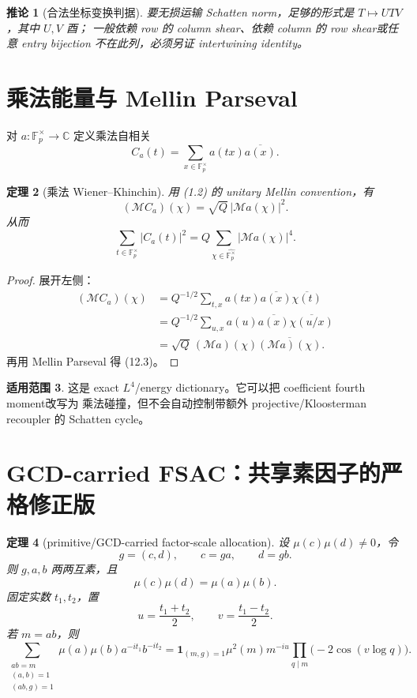 \documentclass[11pt,a4paper]{ctexart}
\newtheorem{theorem}{定理}[section]
\newtheorem{corollary}[theorem]{推论}
\theoremstyle{definition}
\newtheorem{remark}[theorem]{适用范围}
\newcommand{\F}{\mathbb F}
\newcommand{\C}{\mathbb C}
\newcommand{\G}{\F_p^\times}
\newcommand{\Gh}{\widehat{\G}}
\newcommand{\1}{\mathbf 1}
\begin{document}
\begin{corollary}[合法坐标变换判据]
要无损运输 Schatten norm，足够的形式是 $T\mapsto UTV$，其中 $U,V$ 酉；
一般依赖 row 的 column shear、依赖 column 的 row shear或任意 entry bijection
不在此列，必须另证 intertwining identity。
\end{corollary}

\section{乘法能量与 Mellin Parseval}

对 $a:\G\to\C$ 定义乘法自相关
\[
C_a(t)=\sum_{x\in\G}a(tx)\overline{a(x)}.
\tag{12.1}
\]

\begin{theorem}[乘法 Wiener--Khinchin]
用 (1.2) 的 unitary Mellin convention，有
\[
\boxed{
(\mathcal M C_a)(\chi)=\sqrt Q\,|\mathcal Ma(\chi)|^2.}
\tag{12.2}
\]
从而
\[
\boxed{
\sum_{t\in\G}|C_a(t)|^2
=Q\sum_{\chi\in\Gh}|\mathcal Ma(\chi)|^4.}
\tag{12.3}
\]
\end{theorem}

\begin{proof}
展开左侧：
\begin{align*}
(\mathcal MC_a)(\chi)
&=Q^{-1/2}\sum_{t,x}a(tx)\overline{a(x)}\overline{\chi(t)}\\
&=Q^{-1/2}\sum_{u,x}a(u)\overline{a(x)}
\overline{\chi(u/x)}\\
&=\sqrt Q\,(\mathcal Ma)(\chi)\overline{(\mathcal Ma)(\chi)}.
\end{align*}
再用 Mellin Parseval 得 (12.3)。
\end{proof}

\begin{remark}
这是 exact $L^4$/energy dictionary。它可以把 coefficient fourth moment改写为
乘法碰撞，但不会自动控制带额外 projective/Kloosterman recoupler 的 Schatten cycle。
\end{remark}

\section{GCD-carried FSAC：共享素因子的严格修正版}

\begin{theorem}[primitive/GCD-carried factor-scale allocation]\label{thm:gcd-fsac}
设 $\mu(c)\mu(d)\ne0$，令
\[
g=(c,d),\qquad c=ga,\qquad d=gb.
\tag{13.1}
\]
则 $g,a,b$ 两两互素，且
\[
\mu(c)\mu(d)=\mu(a)\mu(b).
\tag{13.2}
\]
固定实数 $t_1,t_2$，置
\[
u=\frac{t_1+t_2}{2},\qquad v=\frac{t_1-t_2}{2}.
\]
若 $m=ab$，则
\[
\sum_{\substack{ab=m\\(a,b)=1\\(ab,g)=1}}
\mu(a)\mu(b)a^{-it_1}b^{-it_2}
=
\mathbf1_{(m,g)=1}\mu^2(m)m^{-iu}
\prod_{q\mid m}\bigl(-2\cos(v\log q)\bigr).
\tag{13.3}
\]
\end{theorem}
\end{document}

